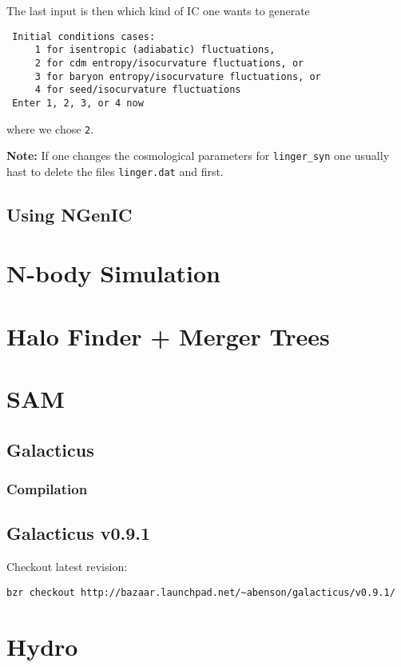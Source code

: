 \documentclass[a4paper,english,10.5pt]{scrartcl}
\begin{document}
\begin{description}
The last input is then which kind of IC one wants to generate 
\begin{verbatim}
 Initial conditions cases:
     1 for isentropic (adiabatic) fluctuations,
     2 for cdm entropy/isocurvature fluctuations, or
     3 for baryon entropy/isocurvature fluctuations, or
     4 for seed/isocurvature fluctuations
 Enter 1, 2, 3, or 4 now
\end{verbatim}
where we chose \texttt{2}. 

\textbf{Note: } If one changes the cosmological parameters for 
\texttt{linger\_syn} one usually hast to delete the files \texttt{linger.dat} 
and  first. 

\end{description}



\subsection{Using NGenIC}

\section{N-body Simulation}

\section{Halo Finder + Merger Trees}

\section{SAM}
\subsection{Galacticus}
\subsubsection{Compilation}


\subsection{Galacticus v0.9.1}

Checkout latest revision: 
\begin{verbatim}
bzr checkout http://bazaar.launchpad.net/~abenson/galacticus/v0.9.1/
\end{verbatim}

\section{Hydro}


\renewcommand{\bibsection}{\section{References}}
\setlength{\bibhang}{1.24cm}
\setlength{\parindent}{3cm}
\setlength{\bibsep}{0cm}

\gdef\harvardand{\&}
\end{document}
